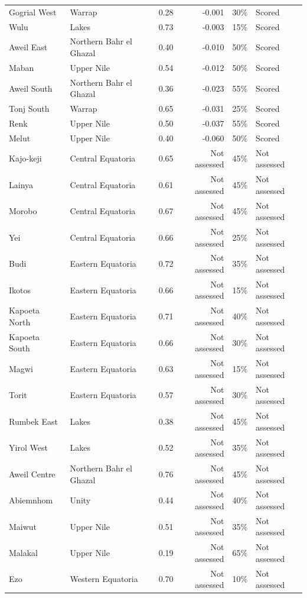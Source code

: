 \begin{longtable}{llrrrl}
Gogrial West & Warrap & 0.28 & -0.001 & 30\% & Scored \\
Wulu & Lakes & 0.73 & -0.003 & 15\% & Scored \\
Aweil East & Northern Bahr el Ghazal & 0.40 & -0.010 & 50\% & Scored \\
Maban & Upper Nile & 0.54 & -0.012 & 50\% & Scored \\
Aweil South & Northern Bahr el Ghazal & 0.36 & -0.023 & 55\% & Scored \\
Tonj South & Warrap & 0.65 & -0.031 & 25\% & Scored \\
Renk & Upper Nile & 0.50 & -0.037 & 55\% & Scored \\
Melut & Upper Nile & 0.40 & -0.060 & 50\% & Scored \\
Kajo-keji & Central Equatoria & 0.65 & Not assessed & 45\% & Not assessed \\
Lainya & Central Equatoria & 0.61 & Not assessed & 45\% & Not assessed \\
Morobo & Central Equatoria & 0.67 & Not assessed & 45\% & Not assessed \\
Yei & Central Equatoria & 0.66 & Not assessed & 25\% & Not assessed \\
Budi & Eastern Equatoria & 0.72 & Not assessed & 35\% & Not assessed \\
Ikotos & Eastern Equatoria & 0.66 & Not assessed & 15\% & Not assessed \\
Kapoeta North & Eastern Equatoria & 0.71 & Not assessed & 40\% & Not assessed \\
Kapoeta South & Eastern Equatoria & 0.66 & Not assessed & 30\% & Not assessed \\
Magwi & Eastern Equatoria & 0.63 & Not assessed & 15\% & Not assessed \\
Torit & Eastern Equatoria & 0.57 & Not assessed & 30\% & Not assessed \\
Rumbek East & Lakes & 0.38 & Not assessed & 45\% & Not assessed \\
Yirol West & Lakes & 0.52 & Not assessed & 35\% & Not assessed \\
Aweil Centre & Northern Bahr el Ghazal & 0.76 & Not assessed & 45\% & Not assessed \\
Abiemnhom & Unity & 0.44 & Not assessed & 40\% & Not assessed \\
Maiwut & Upper Nile & 0.51 & Not assessed & 35\% & Not assessed \\
Malakal & Upper Nile & 0.19 & Not assessed & 65\% & Not assessed \\
Ezo & Western Equatoria & 0.70 & Not assessed & 10\% & Not assessed \\

\end{longtable}
